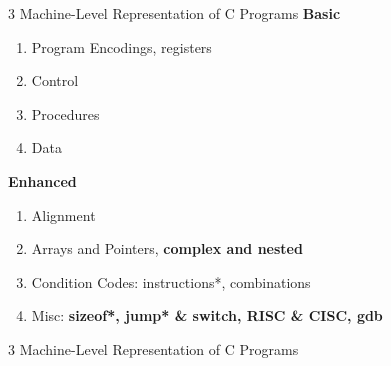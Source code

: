 \documentclass{beamer}
\begin{document}
\begin{frame}{3 Machine-Level Representation of C Programs}
\textbf{Basic}
\begin{enumerate}
	\item Program Encodings, registers
	\item Control
	\item Procedures
	\item Data
\end{enumerate}
\textbf{Enhanced}
\begin{enumerate}
	\item Alignment
	\item Arrays and Pointers, \textbf{complex and nested}
	\item Condition Codes: instructions*, combinations
	\item Misc: \textbf{sizeof*, jump* \& switch, RISC \& CISC, gdb}
\end{enumerate}
\end{frame}

\begin{frame}{3 Machine-Level Representation of C Programs}
	\only<1> {
	}
	 {
	}
\end{frame}
\end{document}
